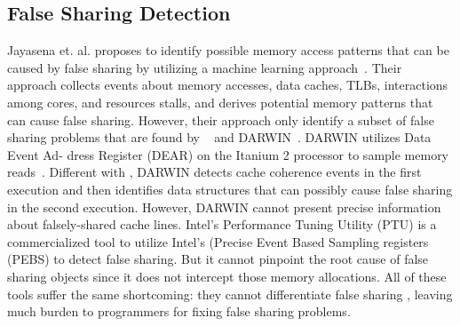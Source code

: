 \label{sec:relatedwork}

\subsection{False Sharing Detection}
Jayasena et. al. proposes to identify possible memory access patterns that can be caused by false sharing by utilizing a machine learning approach~\cite{mldetect}. Their approach collects events about memory accesses, data caches, TLBs, interactions among cores, and resources stalls, and derives potential memory patterns that can cause false sharing. However, their approach only identify a subset of false sharing problems that are found by \Predator{}~\cite{Predator} and DARWIN~\cite{openmp}. DARWIN utilizes Data Event Ad-
dress Register (DEAR) on the Itanium 2 processor to sample memory reads~\cite{Wicaksono11detectingfalse, openmp}. Different with \Cheetah{}, DARWIN detects cache coherence events in the first execution and then identifies data structures that can possibly cause false sharing in the second execution.  However, DARWIN cannot present precise information about falsely-shared cache lines. Intel's Performance Tuning Utility (PTU) is a commercialized tool to utilize Intel's (Precise Event Based Sampling registers (PEBS) to detect false sharing. But it cannot pinpoint the root cause of false sharing objects since it does not intercept those memory allocations. 
All of these tools suffer the same shortcoming: they cannot differentiate false sharing , leaving much burden to programmers for fixing false sharing problems. 
